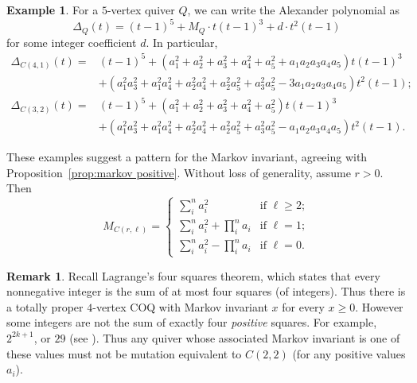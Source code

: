 \documentclass[11pt, letterpaper]{amsart}
\theoremstyle{definition}
\newtheorem{remark}[theorem]{Remark}
\newtheorem{example}[theorem]{Example}
\numberwithin{equation}{section}
\begin{document}
\begin{example}
\noindent
For a $5$-vertex quiver $Q$, we can write the Alexander polynomial as
$$\Delta_Q(t) = (t-1)^5 + M_Q \cdot t(t-1)^3 + d \cdot t^2 (t-1)$$
for some integer coefficient $d$. In particular,
\begin{align*}
\Delta_{C(4,1)}(t) =& (t-1)^5 + (a_1^2 + a_2^2 + a_3^2 + a_4^2 + a_5^2 + a_1 a_2 a_3 a_4 a_5) t (t-1)^3 \\ 
& + ( a_1^2 a_3^2 + a_1^2 a_4^2 + a_2^2 a_4^2 + a_2^2 a_5^2 + a_3^2 a_5^2 - 3 a_1a_2a_3a_4a_5) t^2(t - 1); \\
\Delta_{C(3,2)}(t) =& (t-1)^5 + ( a_1^2 + a_2^2 + a_3^2 + a_4^2 + a_5^2) t (t-1)^3 \\ 
& + (a_1^2a_3^2 + a_1^2a_4^2 + a_2^2a_4^2 + a_2^2a_5^2 + a_3^2a_5^2 - a_1a_2a_3a_4a_5)  t^2(t - 1).
\end{align*}

These examples suggest a pattern for the Markov invariant, agreeing with Proposition~\ref{prop:markov positive}. Without loss of generality, assume $r > 0$. Then
\begin{equation*}
M_{C(r, \ell)} = 
\begin{cases} 
\sum_i^n a_i^2 & \text{if } \ell \geq 2; \\ 
\sum_i^n a_i^2 + \prod_i^n a_i  & \text{if } \ell =1; \\ 
\sum_i^n a_i^2 - \prod_i^n a_i & \text{if } \ell =0.
\end{cases}
\end{equation*}
\end{example}

\begin{remark}
\label{rem:impossible values}
Recall Lagrange's four squares theorem, which states that every nonnegative integer is the sum of at most four squares (of integers).
Thus there is a totally proper $4$-vertex COQ with Markov invariant $x$ for every $x \geq 0$.
However some integers are not the sum of exactly four \emph{positive} squares. 
For example, $2^{2k+1}$, or $29$ (see \cite{A000534}).
Thus any quiver whose associated Markov invariant is one of these values must not be mutation equivalent to $C(2, 2)$ (for any positive values $a_i$).
\end{remark}
\end{document}

